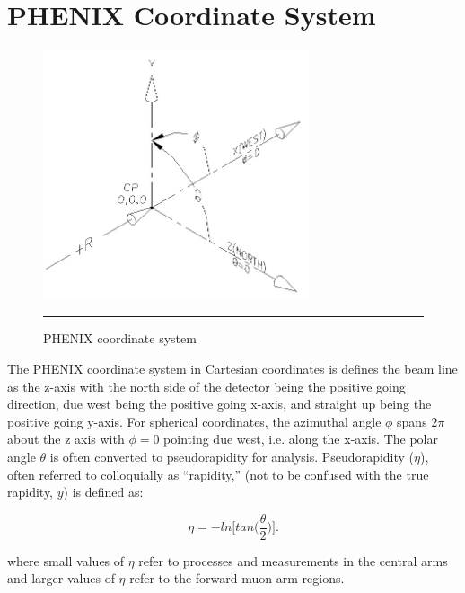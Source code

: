 \appendix
\chapter{PHENIX Coordinate System} %
\label{app:coordinates}
\begin{figure}[htbp!]
  \centering
    \includegraphics[width=0.7\textwidth]{Figures/coord2.jpg}
    \rule{35em}{0.5pt}
  \caption[PHENIX coordinate system]{PHENIX coordinate system}
  \label{fig:PHENIXcoord}
\end{figure}

The PHENIX coordinate system in Cartesian coordinates is defines the beam line as the z-axis with the north side of the detector being the positive going direction, due west being the positive going x-axis, and straight up being the positive going y-axis. For spherical coordinates, the azimuthal angle $\phi$ spans $2\pi$ about the z axis with $\phi=0$ pointing due west, i.e. along the x-axis. The polar angle $\theta$ is often converted to pseudorapidity for analysis. Pseudorapidity ($\eta$), often referred to colloquially as ``rapidity,'' (not to be confused with the true rapidity, $y$) is defined as:

\begin{equation}
\eta = - ln \bigg[ tan \bigg( \frac{\theta}{2} \bigg) \bigg].
\end{equation}

where small values of $\eta$ refer to processes and measurements in the central arms and larger values of $\eta$ refer to the forward muon arm regions.
